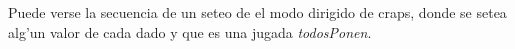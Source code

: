  { 
Puede verse la secuencia de un seteo de el modo dirigido de craps, donde se setea alg'un valor de cada dado
y que es una jugada \textit{todosPonen}.}
\tam


\tam



